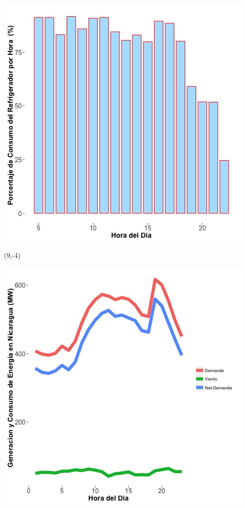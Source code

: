 \documentclass{article}\usepackage[]{graphicx}\usepackage[]{color}
\newenvironment{knitrout}{}{} %
\begin{document}
\begin{knitrout}
\color{fgcolor}
\includegraphics[scale=0.65]{figure/A14_fridge_energy_pct.jpg} 
\end{knitrout}

 \begin{textblock}{1}(9,-4)
\begin{minipage}{20em}
\begingroup

\endgroup
\end{minipage}
\end{textblock}

\vspace{20cm}

\begin{knitrout}
\color{fgcolor}
\includegraphics[scale=0.65]{figure/gridplot1.jpg} 
\end{knitrout}
\end{document}
